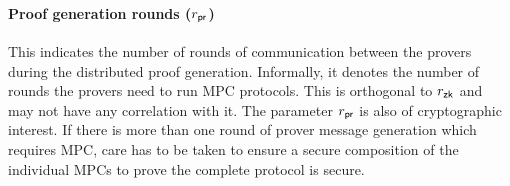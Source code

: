 \paragraph{Proof generation rounds ($r_\mathsf{pr}$)}
This indicates the number of rounds of communication between the provers during
the distributed proof generation. Informally, it denotes the number of rounds the provers need to run MPC protocols. %
 This is orthogonal  to $r_\mathsf{zk}$ and may not have any correlation with it. %
The parameter $r_\mathsf{pr}$ is also of cryptographic interest. If there is more than one round of prover message generation which requires MPC, care has to be taken to ensure a secure composition of the individual MPCs to prove the complete protocol is secure.

